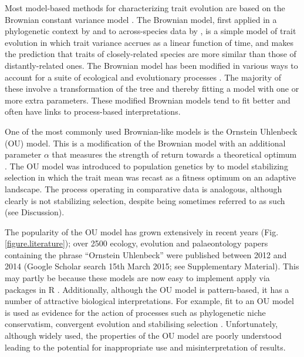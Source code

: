 \documentclass[a4paper,12pt]{article}
\begin{document}
  Most model-based methods for characterizing trait evolution are based on the Brownian constant variance model \citep[for exceptions see][]{price1997correlated,harvey2000comparative,freckleton2006detecting}. 
  The Brownian model, first applied in a phylogenetic context by \citet{cavalli1967} and to across-species data by \citet{felsenstein1973maximum}, is a simple model of trait evolution in which trait variance accrues as a linear function of time, and makes the prediction that traits of closely-related species are more similar than those of distantly-related ones. 
  The Brownian model has been modified in various ways to account for a suite of ecological and evolutionary processes \citep[e.g.,][]{grafen1989phylogenetic,hansen1997stabilizing,Pagel:1997aa,Pagel:1999aa}. 
  The majority of these involve a transformation of the tree and thereby fitting a model with one or more extra parameters. 
  These modified Brownian models tend to fit better and often have links to process-based interpretations. 

  One of the most commonly used Brownian-like models is the Ornstein Uhlenbeck (OU) model. 
  This is a modification of the Brownian model with an additional parameter $\alpha$ that measures the strength of return towards a theoretical optimum \citep{hansen1997stabilizing}. 
  The OU model was introduced to population genetics by \cite{Lande:1976aa} to model stabilizing selection in which the trait mean was recast as a fitness optimum on an adaptive landscape. 
  The process operating in comparative data is analogous, although clearly is not stabilizing selection, despite being sometimes referred to as such (see Discussion).

  The popularity of the OU model has grown extensively in recent years (Fig. \ref{figure.literature}); over 2500 ecology, evolution and palaeontology papers containing the phrase ``Ornstein Uhlenbeck'' were published between 2012 and 2014 (Google Scholar search 15th March 2015; see Supplementary Material). %
  This may partly be because these models are now easy to implement apply via packages in R \citep[e.g. ouch, GEIGER and OUwie;][]{Butler:2004aa,Harmon:2008aa,beaulieu2012ouwie}. 
  Additionally, although the OU model is pattern-based, it has a number of attractive biological interpretations. 
  For example, fit to an OU model is used as evidence for the action of processes such as phylogenetic niche conservatism, convergent evolution and stabilising selection \citep[e.g.,][]{Wiens:2010aa,christin2013anatomical,ingram2013surface}. 
  Unfortunately, although widely used, the properties of the OU model are poorly understood leading to the potential for inappropriate use and misinterpretation of results. 
 
\end{document}
